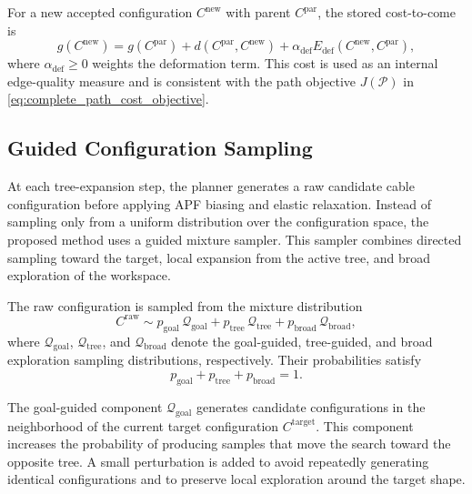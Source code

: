 \documentclass{pas}
\begin{document}
For a new accepted configuration \(C^{\mathrm{new}}\) with parent \(C^{\mathrm{par}}\), the stored cost-to-come is
\begin{equation}
g(C^{\mathrm{new}})
=
g(C^{\mathrm{par}})
+
d(C^{\mathrm{par}},C^{\mathrm{new}})
+
\alpha_{\mathrm{def}}
E_{\mathrm{def}}(C^{\mathrm{new}},C^{\mathrm{par}}),
\label{eq:tree_cost_to_come}
\end{equation}
where \(\alpha_{\mathrm{def}}\geq0\) weights the deformation term. This cost is used as an internal edge-quality measure and is consistent with the path objective \(J(\mathcal{P})\) in \eqref{eq:complete_path_cost_objective}.

\subsection{Guided Configuration Sampling}
\label{subsec:gcr_guided_sampling}

At each tree-expansion step, the planner generates a raw candidate cable
configuration before applying APF biasing and elastic relaxation. Instead of
sampling only from a uniform distribution over the configuration space, the
proposed method uses a guided mixture sampler. This sampler combines directed
sampling toward the target, local expansion from the active tree, and broad
exploration of the workspace.

The raw configuration is sampled from the mixture distribution
\begin{equation}
C^{\mathrm{raw}}
\sim
p_{\mathrm{goal}}\,\mathcal{Q}_{\mathrm{goal}}
+
p_{\mathrm{tree}}\,\mathcal{Q}_{\mathrm{tree}}
+
p_{\mathrm{broad}}\,\mathcal{Q}_{\mathrm{broad}},
\label{eq:guided_mixture_sampler}
\end{equation}
where \(\mathcal{Q}_{\mathrm{goal}}\), \(\mathcal{Q}_{\mathrm{tree}}\), and
\(\mathcal{Q}_{\mathrm{broad}}\) denote the goal-guided, tree-guided, and broad
exploration sampling distributions, respectively. Their probabilities satisfy
\begin{equation}
p_{\mathrm{goal}}+p_{\mathrm{tree}}+p_{\mathrm{broad}}=1.
\label{eq:guided_sampler_probabilities}
\end{equation}

The goal-guided component \(\mathcal{Q}_{\mathrm{goal}}\) generates candidate
configurations in the neighborhood of the current target configuration
\(C^{\mathrm{target}}\). This component increases the probability of producing
samples that move the search toward the opposite tree. A small perturbation is
added to avoid repeatedly generating identical configurations and to preserve
local exploration around the target shape.
\end{document}
